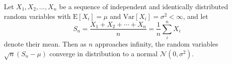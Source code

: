 \documentclass[9pt,twocolumn,twoside]{gsajnl}
\begin{document}
Let $X_1, X_2, \ldots, X_n$ be a sequence of independent and identically distributed random variables with $\text{E}[X_i] = \mu$ and $\text{Var}[X_i] = \sigma^2 < \infty$, and let
\begin{equation}
S_n = \frac{X_1 + X_2 + \cdots + X_n}{n}
      = \frac{1}{n}\sum_{i}^{n} X_i
\label{eq:refname1}
\end{equation}
denote their mean. Then as $n$ approaches infinity, the random variables $\sqrt{n}(S_n - \mu)$ converge in distribution to a normal $\mathcal{N}(0, \sigma^2)$.


\end{document}
